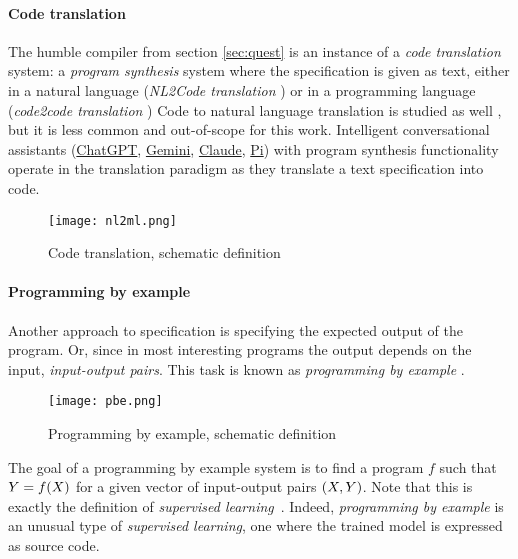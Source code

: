 \paragraph{Code translation}

The humble compiler from section \ref{sec:quest} is an instance of a \emph{code translation} system: a \emph{program synthesis} system where the specification is given as text, either in a natural language (\emph{NL2Code translation} \cite{wangNaturalLanguageCode2023, zanLargeLanguageModels2023}) or in a programming language (\emph{code2code translation} \cite{radfordImprovingLanguageUnderstanding})
Code to natural language translation is studied as well \cite[section 5.1]{leDeepLearningSource2020}, but it is less common and out-of-scope for this work.
Intelligent conversational assistants (\href{https://chat.openai.com/}{ChatGPT}, \href{https://gemini.google.com}{Gemini}, \href{https://claude.ai/}{Claude}, \href{https://pi.ai/}{Pi}) with program synthesis functionality operate in the translation paradigm as they translate a text specification into code.

\begin{figure}[H]
    \centering
    \texttt{[image: nl2ml.png]}
    \caption{Code translation, schematic definition}
    \label{fig:nl2ml}
\end{figure}

\paragraph{Programming by example}

Another approach to specification is specifying the expected output of the program. Or, since in most interesting programs the output depends on the input, \emph{input-output pairs}. This task is known as \emph{programming by example} \cite{halbertProgrammingExample1984, psb2}.

\begin{figure}[H]
    \centering
    \texttt{[image: pbe.png]}
    \caption{Programming by example, schematic definition}
    \label{fig:pbe}
\end{figure}

The goal of a programming by example system is to find a program $f$ such that $Y=f(X)$ for a given vector of input-output pairs $(X,Y)$. 
Note that this is exactly the definition of \emph{supervised learning}~\cite{cunninghamSupervisedLearning2008}.
Indeed, \emph{programming by example} is an unusual type of \emph{supervised learning}, one where the trained model is expressed as source code.

